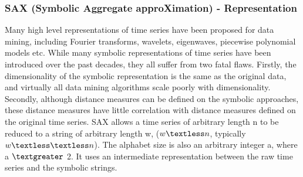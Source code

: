 \documentclass[12pt,a4paper]{report}
\begin{document}
\subsubsection{SAX (Symbolic Aggregate approXimation) - Representation}
Many high level representations of time series have been proposed for data mining, including
Fourier transforms, wavelets, eigenwaves, piecewise polynomial models etc.
While many symbolic representations of time series have been introduced over
the past decades, they all suffer from two fatal flaws. Firstly, the dimensionality of the symbolic
representation is the same as the original data, and virtually all data mining algorithms scale poorly with
dimensionality. Secondly, although distance measures can be defined on the symbolic approaches, these
distance measures have little correlation with distance measures defined on the original time series.
SAX allows a time series of arbitrary length n to be reduced to a string of arbitrary length w, ($w \textless n$, typically
$w \textless\textless n$). The alphabet size is also an arbitrary integer a, where a $\textgreater$ 2.
It uses an intermediate representation between the raw time
series and the symbolic strings.
\end{document}

